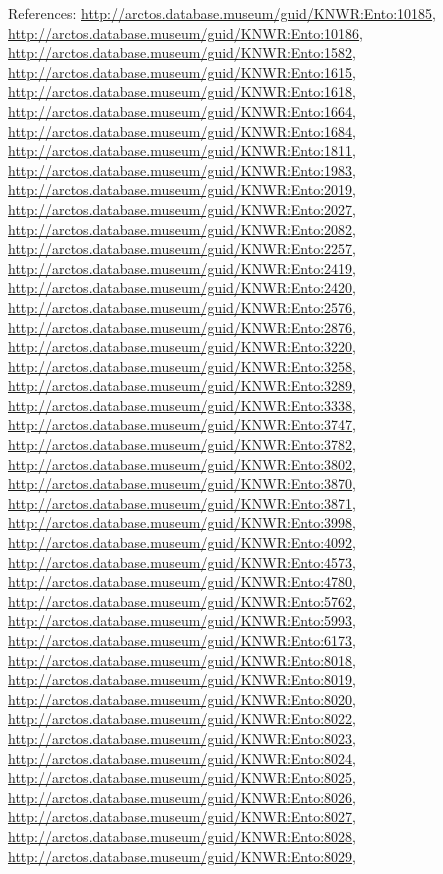 \documentclass[9pt, article]{memoir}
\begin{document}
\begin{multicols}{2}
\vspace{6pt}References: 
\url{http://arctos.database.museum/guid/KNWR:Ento:10185}, 
\url{http://arctos.database.museum/guid/KNWR:Ento:10186}, 
\url{http://arctos.database.museum/guid/KNWR:Ento:1582}, 
\url{http://arctos.database.museum/guid/KNWR:Ento:1615}, 
\url{http://arctos.database.museum/guid/KNWR:Ento:1618}, 
\url{http://arctos.database.museum/guid/KNWR:Ento:1664}, 
\url{http://arctos.database.museum/guid/KNWR:Ento:1684}, 
\url{http://arctos.database.museum/guid/KNWR:Ento:1811}, 
\url{http://arctos.database.museum/guid/KNWR:Ento:1983}, 
\url{http://arctos.database.museum/guid/KNWR:Ento:2019}, 
\url{http://arctos.database.museum/guid/KNWR:Ento:2027}, 
\url{http://arctos.database.museum/guid/KNWR:Ento:2082}, 
\url{http://arctos.database.museum/guid/KNWR:Ento:2257}, 
\url{http://arctos.database.museum/guid/KNWR:Ento:2419}, 
\url{http://arctos.database.museum/guid/KNWR:Ento:2420}, 
\url{http://arctos.database.museum/guid/KNWR:Ento:2576}, 
\url{http://arctos.database.museum/guid/KNWR:Ento:2876}, 
\url{http://arctos.database.museum/guid/KNWR:Ento:3220}, 
\url{http://arctos.database.museum/guid/KNWR:Ento:3258}, 
\url{http://arctos.database.museum/guid/KNWR:Ento:3289}, 
\url{http://arctos.database.museum/guid/KNWR:Ento:3338}, 
\url{http://arctos.database.museum/guid/KNWR:Ento:3747}, 
\url{http://arctos.database.museum/guid/KNWR:Ento:3782}, 
\url{http://arctos.database.museum/guid/KNWR:Ento:3802}, 
\url{http://arctos.database.museum/guid/KNWR:Ento:3870}, 
\url{http://arctos.database.museum/guid/KNWR:Ento:3871}, 
\url{http://arctos.database.museum/guid/KNWR:Ento:3998}, 
\url{http://arctos.database.museum/guid/KNWR:Ento:4092}, 
\url{http://arctos.database.museum/guid/KNWR:Ento:4573}, 
\url{http://arctos.database.museum/guid/KNWR:Ento:4780}, 
\url{http://arctos.database.museum/guid/KNWR:Ento:5762}, 
\url{http://arctos.database.museum/guid/KNWR:Ento:5993}, 
\url{http://arctos.database.museum/guid/KNWR:Ento:6173}, 
\url{http://arctos.database.museum/guid/KNWR:Ento:8018}, 
\url{http://arctos.database.museum/guid/KNWR:Ento:8019}, 
\url{http://arctos.database.museum/guid/KNWR:Ento:8020}, 
\url{http://arctos.database.museum/guid/KNWR:Ento:8022}, 
\url{http://arctos.database.museum/guid/KNWR:Ento:8023}, 
\url{http://arctos.database.museum/guid/KNWR:Ento:8024}, 
\url{http://arctos.database.museum/guid/KNWR:Ento:8025}, 
\url{http://arctos.database.museum/guid/KNWR:Ento:8026}, 
\url{http://arctos.database.museum/guid/KNWR:Ento:8027}, 
\url{http://arctos.database.museum/guid/KNWR:Ento:8028}, 
\url{http://arctos.database.museum/guid/KNWR:Ento:8029}, 

\end{multicols}
\end{document}
